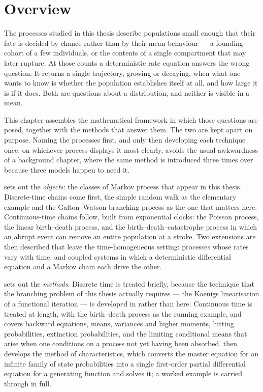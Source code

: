 \section{Overview}
\label{m:sec:overview}

The processes studied in this thesis describe populations small enough that their
fate is decided by chance rather than by their mean behaviour --- a founding cohort
of a few individuals, or the contents of a single compartment that may later
rupture. At those counts a deterministic rate equation answers the wrong question.
It returns a single trajectory, growing or decaying, when what one wants to know is
whether the population establishes itself at all, and how large it is if it does.
Both are questions about a distribution, and neither is visible in a mean.

This chapter assembles the mathematical framework in which those questions are
posed, together with the methods that answer them. The two are kept apart on
purpose. Naming the processes first, and only then developing each technique once,
on whichever process displays it most clearly, avoids the usual awkwardness of a
background chapter, where the same method is introduced three times over because
three models happen to need it.

 sets out the \emph{objects}: the classes of Markov process that
appear in this thesis. Discrete-time chains come first, the simple random walk as
the elementary example and the Galton--Watson branching process as the one that
matters here. Continuous-time chains follow, built from exponential clocks: the
Poisson process, the linear birth--death process, and the
birth--death--catastrophe process in which an abrupt event can remove an entire
population at a stroke. Two extensions are then described that leave the
time-homogeneous setting: processes whose rates vary with time, and coupled systems
in which a deterministic differential equation and a Markov chain each drive the
other.

 sets out the \emph{methods}. Discrete time is treated briefly,
because the technique that the branching problem of this thesis actually requires
--- the Koenigs linearisation of a functional iteration --- is developed in \ChA{}
rather than here. Continuous time is treated at length, with the birth--death
process as the running example, and covers backward equations, means, variances and
higher moments, hitting probabilities, extinction probabilities, and the limiting
conditional means that arise when one conditions on a process not yet having been
absorbed.  then develops the method of characteristics, which
converts the master equation for an infinite family of state probabilities into a
single first-order partial differential equation for a generating function and
solves it; a worked example is carried through in full.

